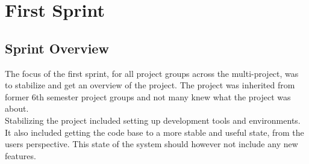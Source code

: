 \chapter{First Sprint}
\label{cha:sprint_1}

\section{Sprint Overview}


The focus of the first sprint, for all project groups across the multi-project, was to stabilize and get an overview of the project. The project was inherited from former 6th semester project groups and not many knew what the \giraf project was about.
\\
Stabilizing the project included setting up development tools and environments. It also included getting the code base to a more stable and useful state, from the users perspective. This state of the system should however not include any new features.


